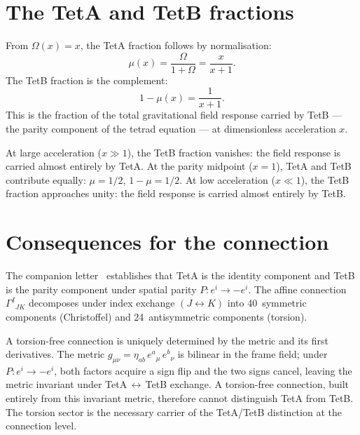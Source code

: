 \documentclass[twocolumn]{iopjournal}
\begin{document}

\section*{The TetA and TetB fractions}

From $\Omega(x) = x$, the TetA fraction follows by
normalisation:
\begin{equation}
  \mu(x) = \frac{\Omega}{1 + \Omega} = \frac{x}{x + 1}.
  \label{eq:mu}
\end{equation}
The TetB fraction is the complement:
\begin{equation}
  \boxed{1 - \mu(x) = \frac{1}{x + 1}.}
  \label{eq:tetb_result}
\end{equation}
This is the fraction of the total gravitational field
response carried by TetB --- the parity component of the
tetrad equation --- at dimensionless acceleration $x$.

At large acceleration ($x \gg 1$), the TetB fraction
vanishes: the field response is carried almost entirely by
TetA. At the parity midpoint ($x = 1$), TetA and TetB
contribute equally: $\mu = 1/2$, $1 - \mu = 1/2$. At low
acceleration ($x \ll 1$), the TetB fraction approaches
unity: the field response is carried almost entirely by TetB.


\section*{Consequences for the connection}

The companion letter~\cite{Nelson2026a} establishes that
TetA is the identity component and TetB is the parity
component under spatial parity $P: e^i \to -e^i$. The
affine connection $\Gamma^I{}_{JK}$ decomposes under index
exchange $(J \leftrightarrow K)$ into 40~symmetric components
(Christoffel) and 24~antisymmetric components (torsion).

A torsion-free connection is uniquely determined by the metric
and its first derivatives. The metric
$g_{\mu\nu} = \eta_{ab}\,e^a{}_\mu\,e^b{}_\nu$ is bilinear
in the frame field; under $P: e^i \to -e^i$, both factors
acquire a sign flip and the two signs cancel, leaving the
metric invariant under TetA$\,\leftrightarrow\,$TetB exchange.
A torsion-free connection, built entirely from this invariant
metric, therefore cannot distinguish TetA from TetB. The
torsion sector is the necessary carrier of the TetA/TetB
distinction at the connection level.
\end{document}

